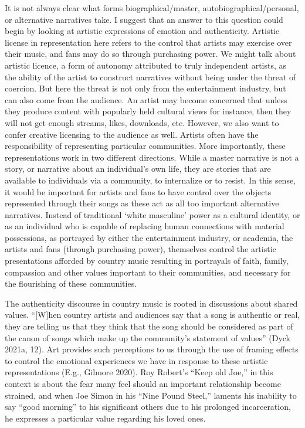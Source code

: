 \documentclass[
  letterpaper,
  DIV=11,
  numbers=noendperiod]{scrartcl}
\theoremstyle{remark}
\begin{document}
It is not always clear what forms biographical/master,
autobiographical/personal, or alternative narratives take. I suggest
that an answer to this question could begin by looking at artistic
expressions of emotion and authenticity. Artistic license in
representation here refers to the control that artists may exercise over
their music, and fans may do so through purchasing power. We might talk
about artistic licence, a form of autonomy attributed to truly
independent artists, as the ability of the artist to construct
narratives without being under the threat of coercion. But here the
threat is not only from the entertainment industry, but can also come
from the audience. An artist may become concerned that unless they
produce content with popularly held cultural views for instance, then
they will not get enough streams, likes, downloads, etc. However, we
also want to confer creative licensing to the audience as well. Artists
often have the responsibility of representing particular communities.
More importantly, these representations work in two different
directions. While a master narrative is not a story, or narrative about
an individual's own life, they are stories that are available to
individuals via a community, to internalize or to resist. In this sense,
it would be important for artists and fans to have control over the
objects represented through their songs as these act as all too
important alternative narratives. Instead of traditional `white
masculine' power as a cultural identity, or as an individual who is
capable of replacing human connections with material possessions, as
portrayed by either the entertainment industry, or academia, the artists
and fans (through purchasing power), themselves control the artistic
presentations afforded by country music resulting in portrayals of
faith, family, compassion and other values important to their
communities, and necessary for the flourishing of these communities.

The authenticity discourse in country music is rooted in discussions
about shared values. ``{[}W{]}hen country artists and audiences say that
a song is authentic or real, they are telling us that they think that
the song should be considered as part of the canon of songs which make
up the community's statement of values'' (Dyck 2021a, 12). Art provides
such perceptions to us through the use of framing effects to control the
emotional experiences we have in response to these artistic
representations (E.g., Gilmore 2020). Roy Robert's ``Keep old Joe,'' in
this context is about the fear many feel should an important
relationship become strained, and when Joe Simon in his ``Nine Pound
Steel,'' laments his inability to say ``good morning'' to his
significant others due to his prolonged incarceration, he expresses a
particular value regarding his loved ones.
\end{document}

